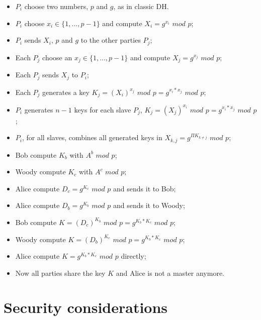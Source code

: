 \documentclass[11pt]{article}
\begin{document}
\begin{itemize}
    \item $P_i$ choose two numbers, $p$ and $g$, as in classic DH.
    \item $P_i$ choose $x_i \in \{1, ..., p-1\}$ and compute $X_i = g^{x_i}$ $mod$ $p$;
    \item $P_i$ sends $X_i$, $p$ and $g$ to the other parties $P_j$;
    \item Each $P_j$ choose an $x_j \in \{1, ..., p-1\}$ and compute $X_j = g^{x_j}$ $mod$ $p$;
    \item Each $P_j$ sends $X_j$ to $P_i$;
    \item Each $P_j$ generates a key $K_j = (X_i)^{x_j}$ $mod$ $p = g^{x_i*x_j}$ $mod$ $p$;
    \item $P_i$ generates $n-1$ keys for each slave $P_j$, $K_j = (X_j)^{x_i}$ $mod$ $p = g^{x_i*x_j}$ $mod$ $p$;
    \item $P_i$, for all slaves, combines all generated keys in $X_{k,j} = g^{\Pi K_{k \neq j} }$ $mod$ $p$;
    \item Bob compute $K_b$ with $A^b$ $mod$ $p$;
    \item Woody compute $K_c$ with $A^c$ $mod$ $p$;
    \item Alice compute $D_c = g^{K_c}$ $mod$ $p$ and sends it to Bob;
    \item Alice compute $D_b = g^{K_b}$ $mod$ $p$ and sends it to Woody;
    \item Bob compute $K = (D_c)^{K_b}$ $mod$ $p = g^{K_b*K_c}$ $mod$ $p$;
    \item Woody compute $K = (D_b)^{K_c}$ $mod$ $p = g^{K_b*K_c}$ $mod$ $p$;
    \item Alice compute $K = g^{K_b*K_c}$ $mod$ $p$ directly;
    \item Now all parties share the key $K$ and Alice is not a master anymore.
\end{itemize}

\section{Security considerations}



\vfill
\end{document}
